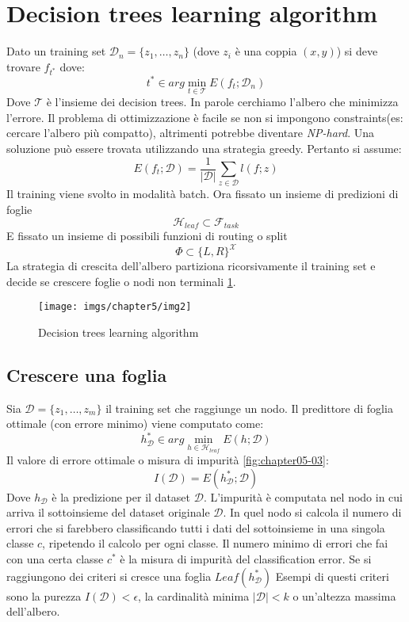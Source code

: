 \section{Decision trees learning algorithm}
Dato un training set $\mathcal{D}_n = \{z_1,\dots, z_n\}$ (dove $z_i$ \`e una coppia $(x,y)$) si deve trovare $f_{t^*}$ dove:
$$t^*\in arg\min\limits_{t\in\mathcal{T}} E(f_t;\mathcal{D}_n)$$
Dove $\mathcal{T}$ \`e l'insieme dei decision trees. 
In parole cerchiamo l'albero che minimizza l'errore.
Il problema di ottimizzazione \`e facile se non si impongono constraints(es: cercare l'albero più compatto), altrimenti potrebbe diventare \emph{NP-hard}.
Una soluzione pu\`o essere trovata utilizzando una strategia greedy.
Pertanto si assume:
$$E(f_t;\mathcal{D}) = \dfrac{1}{|\mathcal{D}|}\sum\limits_{z\in\mathcal{D}}l(f;z)$$
Il training viene svolto in modalit\`a batch.
Ora fissato un insieme di predizioni di foglie
$$\mathcal{H}_{leaf}\subset\mathcal{F}_{task}$$
E fissato un insieme di possibili funzioni di routing o split
$$\Phi\subset\{L,R\}^\mathcal{X}$$
La strategia di crescita dell'albero partiziona ricorsivamente il training set e decide se crescere foglie o nodi non terminali \ref{fig:chapter05-02}. 

\begin{figure}
	\centering
	\texttt{[image: imgs/chapter5/img2]}
	\caption{Decision trees learning algorithm}
	\label{fig:chapter05-02}
\end{figure}


	\subsection{Crescere una foglia}
	Sia $\mathcal{D}=\{z_1, \dots, z_m\}$ il training set che raggiunge un nodo.
	Il predittore di foglia ottimale (con errore minimo) viene computato come:
	$$h^*_\mathcal{D}\in arg\min\limits_{h\in\mathcal{H}_{leaf}} E(h; \mathcal{D})$$
	Il valore di errore ottimale o misura di impurit\`a \ref{fig:chapter05-03}:
	$$I(\mathcal{D}) = E(h^*_\mathcal{D};\mathcal{D})$$
	Dove $h_\mathcal{D}$ \`e la predizione per il dataset $\mathcal{D}$.
	L'impurit\`a \`e computata nel nodo in cui arriva il sottoinsieme del dataset originale $\mathcal{D}$.
	In quel nodo si calcola il numero di errori che si farebbero classificando tutti i dati del sottoinsieme in una singola classe $c$, ripetendo il calcolo per ogni classe.
	Il numero minimo di errori che fai con una certa classe $c^*$ \`e la misura di impurit\`a del classification error.
	Se si raggiungono dei criteri si cresce una foglia $Leaf(h^*_\mathcal{D})$
	Esempi di questi criteri sono la purezza $I(\mathcal{D}) < \epsilon$, la cardinalit\`a minima $|\mathcal{D}|<k$ o un'altezza massima dell'albero.
	
